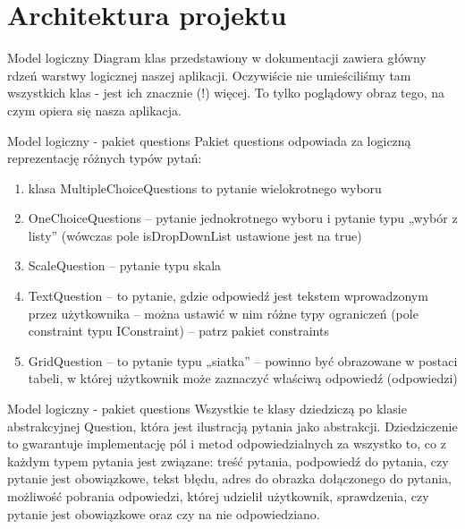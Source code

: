 \documentclass[a4paper,10pt]{beamer}
\begin{document}
		\section{Architektura projektu}
		
		\begin{frame}{Model logiczny}
			Diagram klas przedstawiony w dokumentacji zawiera główny rdzeń warstwy logicznej naszej aplikacji. Oczywiście nie umieściliśmy tam wszystkich klas - jest ich znacznie (!) więcej. To tylko poglądowy obraz tego, na czym opiera się nasza aplikacja.
		\end{frame}
		\begin{frame}{Model logiczny - pakiet questions}
			Pakiet questions odpowiada za logiczną reprezentację różnych typów pytań: 
			\begin{enumerate}
			\item	klasa MultipleChoiceQuestions to pytanie wielokrotnego wyboru
			\item	OneChoiceQuestions – pytanie jednokrotnego wyboru i pytanie typu „wybór z listy” (wówczas pole isDropDownList ustawione jest na true)
			\item	ScaleQuestion – pytanie typu skala
			\item	TextQuestion – to pytanie, gdzie odpowiedź jest tekstem wprowadzonym przez użytkownika – można ustawić w nim różne typy ograniczeń (pole constraint typu IConstraint) – patrz pakiet constraints
			\item	GridQuestion – to pytanie typu „siatka” – powinno być obrazowane w postaci tabeli, w której użytkownik może zaznaczyć właściwą odpowiedź (odpowiedzi)
		\end{enumerate}	
	\end{frame}
	\begin{frame}{Model logiczny - pakiet questions}
		Wszystkie te klasy dziedziczą po klasie abstrakcyjnej Question, która jest ilustracją pytania jako abstrakcji. Dziedziczenie to gwarantuje implementację pól i metod odpowiedzialnych za wszystko to, co z każdym typem pytania jest związane: treść pytania, podpowiedź do pytania, czy pytanie jest obowiązkowe, tekst błędu, adres do obrazka dołączonego do pytania, możliwość pobrania odpowiedzi, której udzielił użytkownik, sprawdzenia, czy pytanie jest obowiązkowe oraz czy na nie odpowiedziano.
	\end{frame}
\end{document}
